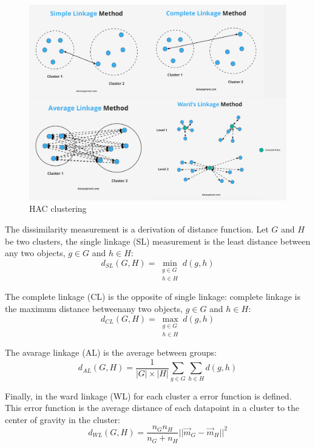 \documentclass[a4paper, 12pt]{article}
\begin{document}
\begin{figure}[ht]
    \centering
    \includegraphics[width=1\textwidth]{HAC Clustering.png}
    \caption{HAC clustering \citep{hierarchicalcluster2020}}
\end{figure}

The dissimilarity measurement is a derivation of distance function. Let $G$ and $H$ be two clusters, the single linkage (SL) measurement is the least distance between any two objects, $g \in G$ and $h \in H$:
\begin{equation} \label{eq17}
    d_{SL}(G, H) = \min_{\substack{g \in G \\ h \in H}}d(g,h)
\end{equation}

The complete linkage (CL) is the opposite of single linkage: complete linkage is the maximum distance betweenany two objects, $g \in G$ and $h \in H$:
\begin{equation} \label{eq18}
    d_{CL}(G, H) = \max_{\substack{g \in G \\ h \in H}}d(g,h)
\end{equation}

The avarage linkage (AL) is the average between groups:
\begin{equation} \label{eq19}
    d_{AL}(G, H) = \frac{1}{|G| \times |H|}\sum_{g \in G}\sum_{h \in H}d(g,h)
\end{equation}

Finally, in the ward linkage (WL) for each cluster a error function is defined. This error function is the average distance of each datapoint in a cluster to the center of gravity in the cluster:
\begin{equation} \label{eq20}
    d_{WL}(G, H) = \frac{n_Gn_H}{n_G + n_H}||\vec{m}_G - \vec{m}_H||^2
\end{equation}
\end{document}
